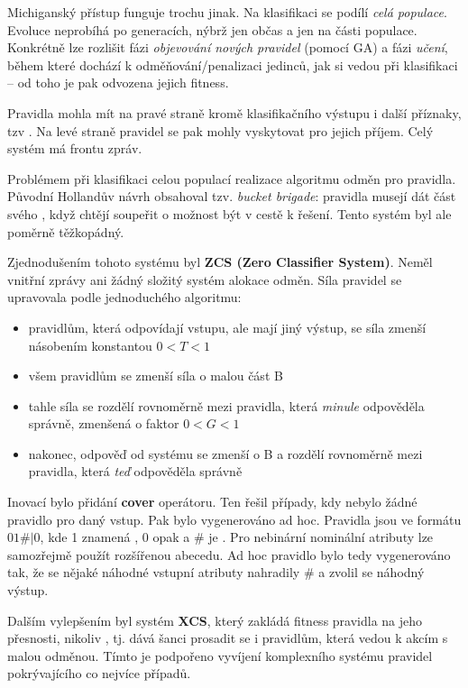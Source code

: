 Michiganský přístup funguje trochu jinak. Na klasifikaci se podílí \textit{celá populace}. Evoluce neprobíhá po generacích, nýbrž jen občas a jen na části populace. Konkrétně lze rozlišit fázi \textit{objevování nových pravidel} (pomocí GA) a fázi \textit{učení}, během které dochází k odměňování/penalizaci jedinců, jak si vedou při klasifikaci -- od toho je pak odvozena jejich fitness.

Pravidla mohla mít na pravé straně kromě klasifikačního výstupu i další příznaky, tzv . Na levé straně pravidel se pak mohly vyskytovat  pro jejich příjem. Celý systém má frontu zpráv.

Problémem při klasifikaci celou populací realizace algoritmu odměn pro pravidla. Původní Hollandův návrh obsahoval tzv. \textit{bucket brigade}: pravidla musejí dát část svého , když chtějí soupeřit o možnost být v cestě k řešení. Tento systém byl ale poměrně těžkopádný. 

Zjednodušením tohoto systému byl \textbf{ZCS (Zero Classifier System)}. Neměl vnitřní zprávy ani žádný složitý systém alokace odměn. Síla pravidel se upravovala podle jednoduchého algoritmu:
\begin{itemize}
	\leftskip 20pt
	\setlength{\itemsep}{0pt}
	\item pravidlům, která odpovídají vstupu, ale mají jiný výstup, se síla zmenší násobením konstantou $0 < T < 1$
	\item všem pravidlům se zmenší síla o malou část B
	\item tahle síla se rozdělí rovnoměrně mezi pravidla, která \textit{minule} odpověděla správně, zmenšená o faktor $0<G<1$
	\item nakonec, odpověď od systému se zmenší o B a rozdělí rovnoměrně mezi pravidla, která \textit{teď} odpověděla správně
\end{itemize}
Inovací bylo přidání \textbf{cover} operátoru. Ten řešil případy, kdy nebylo žádné pravidlo pro daný vstup. Pak bylo vygenerováno ad hoc. Pravidla jsou ve formátu $01\#|0$, kde 1 znamená , 0 opak a $\#$ je . Pro nebinární nominální atributy lze samozřejmě použít rozšířenou abecedu. Ad hoc pravidlo bylo tedy vygenerováno tak, že se nějaké náhodné vstupní atributy nahradily $\#$ a zvolil se náhodný výstup.

Dalším vylepšením byl systém \textbf{XCS}, který zakládá fitness pravidla na jeho přesnosti, nikoliv , tj. dává šanci prosadit se i pravidlům, která vedou k akcím s malou odměnou. Tímto je podpořeno vyvíjení komplexního systému pravidel pokrývajícího co nejvíce případů.




